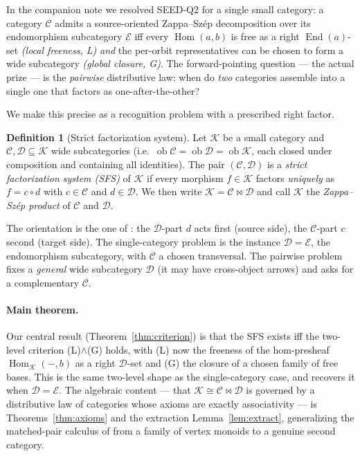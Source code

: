 \documentclass[11pt]{article}
\theoremstyle{definition}
\newtheorem{definition}[theorem]{Definition}
\newcommand{\Hom}{\operatorname{Hom}}
\newcommand{\End}{\operatorname{End}}
\newcommand{\C}{\mathcal{C}}
\newcommand{\D}{\mathcal{D}}
\newcommand{\K}{\mathcal{K}}
\newcommand{\E}{\mathcal{E}}
\newcommand{\ob}{\operatorname{ob}}
\begin{document}
In the companion note \cite{single} we resolved SEED-Q2 for a single small
category: a category $\C$ admits a source-oriented Zappa--Sz\'ep decomposition
over its endomorphism subcategory $\E$ iff every $\Hom(a,b)$ is free as a right
$\End(a)$-set \emph{(local freeness, L)} \emph{and} the per-orbit
representatives can be chosen to form a wide subcategory \emph{(global closure,
G)}. The forward-pointing question --- the actual prize --- is the
\emph{pairwise} distributive law: when do \emph{two} categories assemble into a
single one that factors as one-after-the-other?

We make this precise as a recognition problem with a prescribed right factor.

\begin{definition}[Strict factorization system]\label{def:sfs}
Let $\K$ be a small category and $\C,\D\subseteq\K$ wide subcategories (i.e.\
$\ob\C=\ob\D=\ob\K$, each closed under composition and containing all
identities). The pair $(\C,\D)$ is a \emph{strict factorization system (SFS)} of
$\K$ if every morphism $f\in\K$ factors \emph{uniquely} as $f=c\circ d$ with
$c\in\C$ and $d\in\D$. We then write $\K=\C\bowtie\D$ and call $\K$ the
\emph{Zappa--Sz\'ep product} of $\C$ and $\D$.
\end{definition}

The orientation is the one of \cite{single}: the $\D$-part $d$ acts first
(source side), the $\C$-part $c$ second (target side). The single-category
problem is the instance $\D=\E$, the endomorphism subcategory, with $\C$ a chosen
transversal. The pairwise problem fixes a \emph{general} wide subcategory $\D$
(it may have cross-object arrows) and asks for a complementary $\C$.

\paragraph{Main theorem.} Our central result (Theorem~\ref{thm:criterion}) is
that the SFS exists iff the two-level criterion (L)$\wedge$(G) holds, with (L)
now the freeness of the hom-presheaf $\Hom_\K(-,b)$ as a right $\D$-set and (G)
the closure of a chosen family of free bases. This is the same two-level shape as
the single-category case, and recovers it when $\D=\E$. The algebraic content ---
that $\K\cong\C\bowtie\D$ is governed by a distributive law of categories whose
axioms are exactly associativity --- is Theorems~\ref{thm:axioms} and the
extraction Lemma~\ref{lem:extract}, generalizing the matched-pair calculus of
\cite{single} from a family of vertex monoids to a genuine second category.
\end{document}
